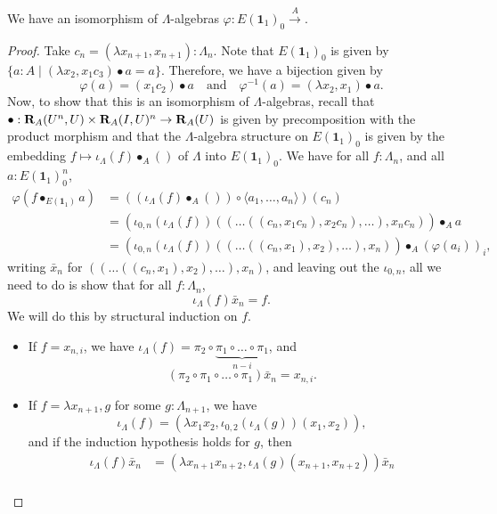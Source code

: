 \begin{lemma}
  We have an isomorphism of $ \Lambda $-algebras $ \varphi: E(\mathbf 1_1)_0 \xrightarrow A $.
\end{lemma}
\begin{proof}
  Take $ c_n = (\lambda x_{n + 1}, x_{n + 1}): \Lambda_n $. Note that $ E(\mathbf 1_1)_0 $ is given by $ \{ a : A \mid (\lambda x_2, x_1 c_3) \bullet a = a \} $. Therefore, we have a bijection given by
  \[ \varphi(a) = (x_1 c_2) \bullet a \quad \text{and} \quad \varphi^{-1}(a) = (\lambda x_2, x_1) \bullet a. \]
  Now, to show that this is an isomorphism of $ \Lambda $-algebras, recall that $ \bullet: \mathbf{R}_A(U^n, U) \times \mathbf{R}_A(I, U)^n \to \mathbf{R}_A(U) $ is given by precomposition with the product morphism and that the $ \Lambda $-algebra structure on $ E(\mathbf 1_1)_0 $ is given by the embedding $ f \mapsto \iota_\Lambda(f) \bullet_A () $ of $ \Lambda $ into $ E(\mathbf 1_1)_0 $. We have for all $ f: \Lambda_n $, and all $ a : E(\mathbf 1_1)_0^n $,
  \begin{align*}
    \varphi(f \bullet_{E(\mathbf 1_1)} a)
    &= ((\iota_\Lambda(f) \bullet_A ()) \circ \langle a_1, \dots, a_n \rangle)(c_n)\\
    &= (\iota_{0, n}(\iota_\Lambda(f)) ((\dots((c_n, x_1 c_n), x_2 c_n), \dots), x_n c_n)) \bullet_A a\\
    &= (\iota_{0, n}(\iota_\Lambda(f)) ((\dots((c_n, x_1), x_2), \dots), x_n)) \bullet_A (\varphi(a_i))_i,
  \end{align*}
  writing $ \bar x_n $ for $ ((\dots((c_n, x_1), x_2), \dots), x_n) $, and leaving out the $ \iota_{0, n} $, all we need to do is show that for all $ f: \Lambda_n $,
  \[ \iota_\Lambda(f) \bar x_n = f. \]
  We will do this by structural induction on $ f $.
  \begin{itemize}
    \item If $ f = x_{n, i} $, we have $ \iota_\Lambda(f) = \pi_2 \circ \underbrace{\pi_1 \circ \dots \circ \pi_1}_{n - i} $, and
      \[ (\pi_2 \circ \pi_1 \circ \dots \circ \pi_1) \bar x_n = x_{n, i}. \]
    \item If $ f = \lambda x_{n + 1}, g $ for some $ g: \Lambda_{n + 1} $, we have
      \[ \iota_\Lambda(f) = (\lambda x_1 x_2, \iota_{0, 2}(\iota_\Lambda(g)) (x_1, x_2)), \]
      and if the induction hypothesis holds for $ g $, then
      \begin{align*}
        \iota_\Lambda(f) \bar x_n
        &= (\lambda x_{n + 1} x_{n + 2}, \iota_\Lambda(g) (x_{n + 1}, x_{n + 2})) \bar x_n\\

\end{align*}
\end{itemize}
\end{proof}
